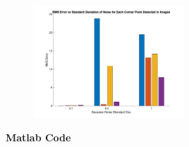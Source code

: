 \documentclass[12pt]{article}
\begin{document}
\begin{enumerate}
\begin{figure}[H]
		\includegraphics[width=0.5\textwidth]{Q6C_final_distribution_result.jpg}
	\end{figure}
		
		
\end{enumerate}
\newpage
\textbf{Matlab Code}
%
\end{document}
